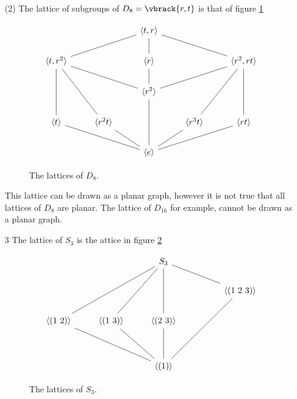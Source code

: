 \begin{example}
\begin{enumerate}
        \item[(2)] The lattice of subgroups of $D_8=\vbrack{r,t}$ is that of
            figure \ref{fig_2.2}
            \begin{figure}[h]
\[\begin{tikzcd}
	&& {\langle t,r \rangle} \\
	{\langle t,r^2 \rangle} && {\langle r \rangle} && {\langle r^2,rt \rangle} \\
	&& {\langle r^2 \rangle} \\
	{\langle t \rangle} & {\langle r^2t \rangle} && {\langle r^3t \rangle} & {\langle rt \rangle} \\
	&& {\langle e \rangle}
	\arrow[no head, from=1-3, to=2-1]
	\arrow[no head, from=2-1, to=3-3]
	\arrow[no head, from=3-3, to=2-5]
	\arrow[no head, from=2-5, to=1-3]
	\arrow[no head, from=1-3, to=2-3]
	\arrow[no head, from=2-3, to=3-3]
	\arrow[no head, from=3-3, to=5-3]
	\arrow[no head, from=2-1, to=4-1]
	\arrow[no head, from=4-1, to=5-3]
	\arrow[no head, from=5-3, to=4-5]
	\arrow[no head, from=4-5, to=2-5]
	\arrow[no head, from=2-5, to=4-4]
	\arrow[no head, from=4-4, to=5-3]
	\arrow[no head, from=5-3, to=4-2]
	\arrow[no head, from=4-2, to=2-1]
\end{tikzcd}\]
                \caption{The lattices of $D_8$.}
                \label{fig_2.2}
            \end{figure}
            This lattice can be drawn as a planar graph, however it is not true
            that all lattices of $D_8$ are planar. The lattice of $D_{16}$
            for example, cannot be drawn as a planar graph.

        \item[3] The lattice of $S_3$ is the attice in figure \ref{fig_2.3}
            \begin{figure}[h]
\[\begin{tikzcd}
	&& {S_3} \\
	&&&& {\langle (1 \ 2 \ 3)\rangle} \\
	{\langle (1 \ 2)\rangle} & {\langle (1 \ 3)\rangle} & {\langle (2 \ 3)\rangle} \\
	\\
	&& {\langle (1)\rangle}
	\arrow[no head, from=1-3, to=3-3]
	\arrow[no head, from=1-3, to=2-5]
	\arrow[no head, from=2-5, to=5-3]
	\arrow[no head, from=3-3, to=5-3]
	\arrow[no head, from=1-3, to=3-2]
	\arrow[no head, from=3-2, to=5-3]
	\arrow[no head, from=1-3, to=3-1]
	\arrow[no head, from=3-1, to=5-3]
\end{tikzcd}\]
                \caption{The lattices of $S_3$.}
                \label{fig_2.3}
            \end{figure}


\end{enumerate}
\end{example}
